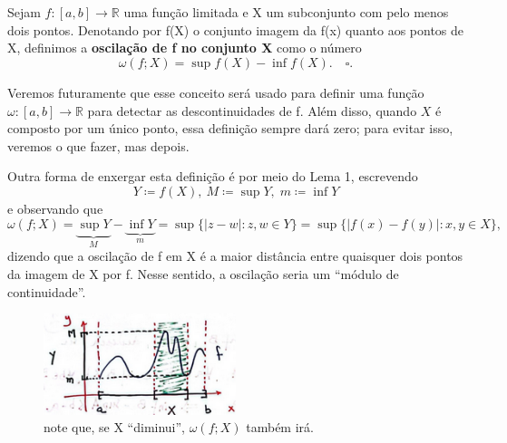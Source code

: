 \documentclass[../analysisII_notes.tex]{subfiles}
\begin{document}
\begin{def*}
	Sejam \(f:[a, b]\rightarrow \mathbb{R}\) uma função limitada e X um subconjunto com pelo menos dois pontos. Denotando por f(X) o conjunto imagem da f(x) quanto aos pontos de X, definimos a \textbf{oscilação de f no conjunto X} como o número
	\[
		\omega (f; X) = \sup_{}f(X)-\inf_{}f(X).\quad \square.
	\]
\end{def*}
Veremos futuramente que esse conceito será usado para definir uma função \(\omega:[a, b]\rightarrow \mathbb{R} \) para detectar as descontinuidades de f. Além disso, quando \(X\) é composto por um único ponto, essa definição sempre dará zero; para evitar isso, veremos o que fazer, mas depois.

Outra forma de enxergar esta definição é por meio do Lema 1, escrevendo
\[
	Y \coloneqq f(X),\: M \coloneqq \sup_{}Y,\; m\coloneqq \inf_{}Y
\]
e observando que
\[
	\omega (f; X) = \underbrace{\sup_{}Y}_{M} - \underbrace{\inf_{}Y}_{m} = \sup_{}\{|z-w|: z, w\in Y\} = \sup_{}\{|f(x)-f(y)|: x,y\in X\},
\]
dizendo que a oscilação de f em X é a maior distância entre quaisquer dois pontos da imagem de X por f. Nesse sentido, a oscilação seria um ``módulo de continuidade''.
\begin{figure}[H]
	\begin{center}
		\includegraphics[height=0.5\textheight, width=0.5\textwidth, keepaspectratio]{./Images/oscilation_07.png}
	\end{center}
	\caption{note que, se X ``diminui'', \(\omega (f; X)\) também irá.}
	\label{oscilation07}
\end{figure}
\end{document}
